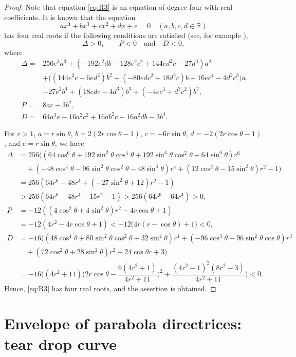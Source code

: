 \documentclass[12pt,a4paper]{amsart}
\theoremstyle{plain}
\theoremstyle{definition}
\theoremstyle{remark}
\numberwithin{equation}{section}
\begin{document}
\begin{proof}
Note that equation \eqref{eq:R3} is an equation of degree four 
with real coefficients. 
It is known that the equation 
$$  ax^4 + bx^3 + cx^2 + dx + e = 0 \quad (a,b,c,d\in\mathbb{R}) $$
has four real roots if the following conditions are satisfied
(see, for example \cite{Rees}),
$$  \Delta>0,\qquad P<0 \quad\mbox{and}\quad D<0, $$ 
where
\begin{align*}
  \Delta=&
    256e^3a^3+(-192e^2db-128e^2c^2+144ed^2c-27d^4)a^2 \\
    & +\big((144e^2c-6ed^2)b^2+(-80edc^2+18d^3c)b+16ec^4-4d^2c^3\big)a \\
    & -27e^2b^4+(18edc-4d^3)b^3+(-4ec^3+d^2c^2)b^2,\\
  P=& 8ac-3b^2, \\
  D=& 64a^3e-16a^2c^2+16ab^2c-16a^2db-3b^4.
\end{align*}

For $ r>1 $, $ a=r\sin\theta$, $ b=2(2r\cos \theta -1)$, $ c=-6r\sin \theta$,
$d=-2(2r\cos\theta -1)$, and $ e=r\sin\theta$, we have
\begin{align*}
  \Delta & =  256((64\cos^6\theta+192\sin^2\theta\cos^4\theta
          +192\sin^4\theta\cos^2\theta+64\sin^6\theta)r^6\\
      & \quad +(-48\cos^4\theta-96\sin^2\theta\cos^2\theta-48\sin^4\theta)r^4
         +(12\cos^2\theta-15\sin^2\theta)r^2-1)\\
      & = 256(64r^6-48r^4+(-27\sin^2\theta+12)r^2-1)\\
      & >  256(64r^6-48r^4-15r^2-1)>256(64r^6-64r^4)>0, \\
  P   & = -12((4\cos^2\theta+4\sin^2\theta)r^2-4r\cos \theta +1)\\
      & =-12(4r^2-4r\cos \theta +1)
          <-12\big(4r(r-\cos\theta)+1\big)<0,\\
  D   & =-16((48\cos^4\theta+80\sin^2\theta\cos^2\theta+32\sin^4\theta)r^4
        +(-96\cos^3\theta-96\sin^2\theta\cos \theta)r^3 \\
      &\quad  +(72\cos^2\theta+28\sin^2\theta)r^2-24\cos \theta r+3)\\
      & = -16\bigg((4r^2+11)\Big(2r\cos \theta-\dfrac{6(4r^2+1)}{4r^2+11}\Big)^2
             +\dfrac{(4r^2-1)^2(8r^2-3)}{4r^2+11}\bigg) <0.
\end{align*}
Hence, \eqref{eq:R3} has four real roots, and the assertion is obtained.
\end{proof}


\section{Envelope of parabola directrices: tear drop curve }
\end{document}
